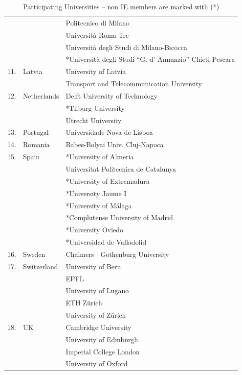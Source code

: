 \documentclass[11pt]{amsart}
\begin{document}
\begin{table}
\begin{center}
\begin{tabular}  {|r|l|l|}
&  & Politecnico di Milano \\
& & Universit\` a Roma Tre \\
&  &  Universit\` a degli Studi di Milano-Bicocca\\
&  & *Universit\` a degli Studi ``G. d' Annunzio'' Chieti Pescara \\
\hline
11.&Latvia   & University of Latvia\\
&  & Transport and Telecommunication University \\
\hline
12.&Netherlands  &  Delft University of Technology\\
& & *Tilburg University \\   
& &  Utrecht University \\
 \hline
13.& Portugal  & Universidade Nova de Lisboa \\
 \hline
14.&Romania  & Babes-Bolyai Univ. Cluj-Napoca \\
\hline
15.&Spain  & *University of Almeria \\
&  & Universitat Politecnica de Catalunya \\
&  &  *University of Extremadura\\
&  &  *University Jaume I\\
&    & *University of M\' alaga \\
&  &  *Complutense University of Madrid\\
&  &  *University Oviedo\\
&  & *Universidad de Valladolid \\
\hline
16.& Sweden   &  Chalmers | Gothenburg University\\
\hline
17.&Switzerland   & University of Bern\\
& & EPFL \\
&  &  University of Lugano \\
 &    & ETH Z\" urich \\
&   &  University of Z\" urich\\
\hline
18.&UK   &  Cambridge University\\
&   &  University of Edinburgh\\
 &  & Imperial College London\\
&  & University of Oxford \\
\hline
\end{tabular}
\vspace*{0.4cm}
\end{center}
\caption{Participating Universities -- non IE members are marked with (*)}
\label{tab:names}
\end{table}







\end{document}
